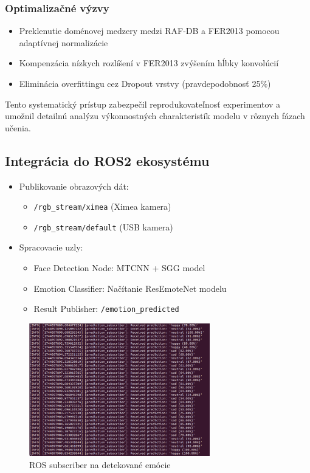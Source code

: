 
\subsubsection{Optimalizačné výzvy}
\begin{itemize}
    \item Preklenutie doménovej medzery medzi RAF-DB a FER2013 pomocou adaptívnej normalizácie
    \item Kompenzácia nízkych rozlíšení v FER2013 zvýšením hĺbky konvolúcií
    \item Eliminácia overfittingu cez Dropout vrstvy (pravdepodobnosť 25\%)
\end{itemize}

Tento systematický prístup zabezpečil reprodukovateľnosť experimentov a umožnil detailnú analýzu výkonnostných charakteristík modelu v rôznych fázach učenia.

\subsection{Integrácia do ROS2 ekosystému}
\begin{itemize}
\item Publikovanie obrazových dát:
  \begin{itemize}
  \item \texttt{/rgb\_stream/ximea} (Ximea kamera)
  \item \texttt{/rgb\_stream/default} (USB kamera)
  \end{itemize}
\item Spracovacie uzly:
  \begin{itemize}
  \item Face Detection Node: MTCNN + SGG model
  \item Emotion Classifier: Načítanie ResEmoteNet modelu
  \item Result Publisher: \texttt{/emotion\_predicted}
  \end{itemize}
\end{itemize}
\begin{figure}[!htpb]
    \centering
    \includegraphics[width=0.7\textwidth]{img/subscriber.png}
    \caption{ROS subscriber na detekované emócie}
    \label{fig:ros2_architecture}
\end{figure}

